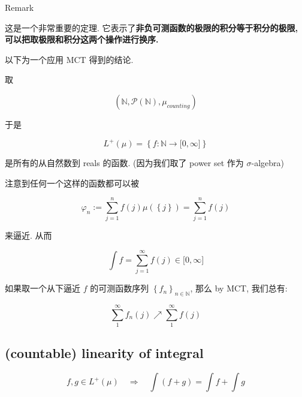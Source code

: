 \begin{qlremark}{Remark}

这是一个非常重要的定理. 它表示了\textbf{非负可测函数的极限的积分等于积分的极限, 可以把取极限和积分这两个操作进行换序.}

\end{qlremark}

以下为一个应用 MCT 得到的结论.

\begin{example}

取

\[(\mathbb{N},\mathcal{P}(\mathbb{N}),\mu_{counting})\]

于是

\[L^{+}(\mu) = \left\{ {f:\mathbb{N}\rightarrow\lbrack 0,\infty\rbrack} \right\}\]

是所有的从自然数到 reals 的函数. (因为我们取了 power set 作为 \(\sigma\)-algebra)

注意到任何一个这样的函数都可以被

\[\varphi_{n} := \sum\limits_{j = 1}^{n}f(j)\mu(\left\{ j \right\}) = \sum\limits_{j = 1}^{n}f(j)\]

来逼近. 从而

\[\int f = \sum\limits_{j = 1}^{\infty}f(j) \in \lbrack 0,\infty\rbrack\]

如果取一个从下逼近 \(f\) 的可测函数序列 \(\left\{ f_{n} \right\}_{n \in \mathbb{N}}\), 那么 by MCT, 我们总有:

\[\sum\limits_{1}^{\infty}f_{n}(j)\operatorname{\nearrow }\sum\limits_{1}^{\infty}f(j)\]

\end{example}

\subsection{(countable) linearity of integral}\label{countable-linearity-of-integral}

\begin{corollary}

\[f,g \in L^{+}(\mu)\quad\Rightarrow\quad\int(f + g) = \int f + \int g\]

\end{corollary}

